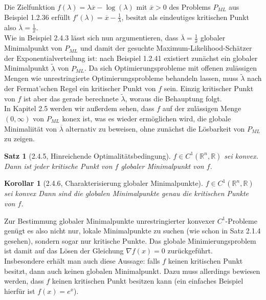 \documentclass[12pt]{extreport} %
\newcommand{\R}{\mathbb{R}}
\theoremstyle{named}
\theoremstyle{nnamed}
\theoremstyle{itshape}
\newtheorem*{satz}{Satz}
\theoremstyle{normal}
\newtheorem*{korollar}{Korollar}
\begin{document}
\begin{beispiel}
	Die Zielfunktion $f(\lambda) = \lambda \overline{x} - \log(\lambda)$ mit $\overline{x} > 0$ des Problems $P_{ML}$ aus Beispiel 1.2.36	erfüllt $f'(\lambda) = \overline{x} - \frac{1}{\lambda}$, besitzt als eindeutiges kritischen Punkt also $\overline{\lambda} = \frac{1}{\overline{x}}$. ~\\
	
	Wie in Beispiel 2.4.3 lässt sich nun argumentieren, dass $\overline{\lambda} = \frac{1}{\overline{x}}$ globaler Minimalpunkt von $P_{ML}$ und damit der gesuchte Maximum-Likelihood-Schätzer der Exponentialverteilung ist: nach Beispiel 1.2.41 existiert zunächst ein globaler Minimalpunkt $\tilde{\lambda}$ von $P_{ML}$. Da sich Optimierungsprobleme mit offenen zulässigen Mengen wie unrestringierte Optimierungsprobleme behandeln lassen, muss $\tilde{\lambda}$ nach der Fermat'schen Regel ein kritischer Punkt von $f$ sein. Einzig kritischer Punkt von $f$ ist aber das gerade berechnete $\tilde{\lambda}$, woraus die Behauptung folgt. ~\\
	
	In Kapitel 2.5 werden wir außerdem sehen, dass $f$ auf der zulässigen Menge $(0, \infty)$ von $P_{ML}$ konex ist, was es wieder ermöglichen wird, die globale Minimaliität von $\overline{\lambda}$ alternativ zu beweisen, ohne zunächst die Lösbarkeit von $P_{ML}$ zu zeigen.
\end{beispiel}


\begin{satz}[2.4.5, Hinreichende Optimalitätsbedingung]
	$f \in C^1(\R^n, \R)$ sei konvex. Dann ist jeder kritische Punkt von $f$ globaler Minimalpunkt von $f$.
\end{satz}

\begin{korollar}[2.4.6, Charakterisierung globaler Minimalpunkte]
	$f \in C^1(\R^n, \R)$ sei konvex	 Dann sind die globalen Minimalpunkte genau die kritischen Punkte von $f$.
\end{korollar}

Zur Bestimmung globaler Minimalpunkte unrestringierter konvexer $C^1$-Probleme genügt es also nicht nur, lokale Minimalpunkte zu suchen (wie schon in Satz 2.1.4 gesehen), sondern sogar nur kritische Punkte. Das globale Minimierungsproblem ist damit auf das Lösen der Gleichung $\nabla f(x) = 0$ zurückgeführt. ~\\

Insbesondere erhält man auch diese Aussage: falls $f$ keinen kritischen Punkt besitzt, dann auch keinen globalen Minimalpunkt. Dazu muss allerdings bewiesen werden, dass $f$ keinen kritischen Punkt besitzen kann (ein einfaches Beispiel hierfür ist $f(x) = e^x$).
\end{document}
